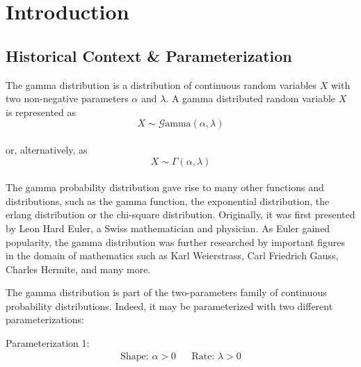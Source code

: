 \documentclass[12pt]{article}
\newcommand{\G}{\mathcal{G}}
\begin{document}
\singlespacing

\tableofcontents\pagebreak
\doublespacing
\section{Introduction}\vspace*{-24pt}
\subsection{Historical Context \& Parameterization}
The gamma distribution\cite{carrierProbabilityStatistics201BNM05} is a distribution of continuous random variables $X$
with two non-negative parameters $\alpha$ and $\lambda$. A gamma distributed random variable $X$ is represented as
\vspace*{-24pt}
\begin{equation}
	X\sim\G\text{amma}(\alpha, \lambda)
\end{equation}\\[-40pt]
or, alternatively, as\vspace*{-6pt}
\begin{equation}
	X\sim\Gamma(\alpha,\lambda)
\end{equation}\\[-60pt]

The gamma probability distribution gave rise to many other functions and distributions, such as the gamma function, the
exponential distribution, the erlang distribution or the chi-square distribution. Originally, it was first presented by
Leon Hard Euler, a Swiss mathematician and physician. As Euler gained popularity, the gamma distribution was further
researched by important figures in the domain of mathematics such as Karl Weierstrass, Carl Friedrich Gauss, Charles
Hermite, and many more\cite{hoschGammaDistribution2017, wikipediaGammaDistribution2022,
sebahIntroductionGammaFunction2002}.

The gamma distribution is part of the two-parameters family of continuous probability distributions. Indeed, it may be
parameterized with two different parameterizations\cite{wikipediaGammaDistribution2022}:

\noindent Parameterization 1:\vspace*{-24pt}
\begin{align}\label{eq:gamma:parameterization:1}
	\text{Shape: } \alpha>0		&&	\text{Rate: }\lambda>0
\end{align}\\[-60pt]
\end{document}
